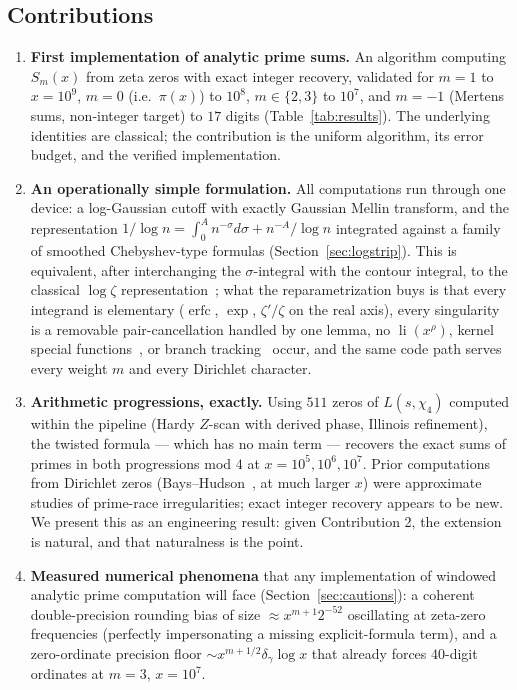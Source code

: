 \documentclass[11pt]{article}
\newcommand{\li}{\operatorname{li}}
\newcommand{\erfc}{\operatorname{erfc}}
\begin{document}
\subsection*{Contributions}
\begin{enumerate}
  \item \textbf{First implementation of analytic prime sums.} An algorithm
    computing $S_m(x)$ from zeta zeros with exact integer recovery,
    validated for $m=1$ to $x=10^9$, $m=0$ (i.e.\ $\pi(x)$) to $10^8$,
    $m\in\{2,3\}$ to $10^7$, and $m=-1$ (Mertens sums, non-integer target)
    to $17$ digits (Table~\ref{tab:results}). The underlying identities are
    classical; the contribution is the uniform algorithm, its error
    budget, and the verified implementation.
  \item \textbf{An operationally simple formulation.} All computations run
    through one device: a log-Gaussian cutoff with exactly Gaussian Mellin
    transform, and the representation
    $1/\log n=\int_0^A n^{-\sigma}d\sigma+n^{-A}/\log n$ integrated against
    a family of smoothed Chebyshev-type formulas
    (Section~\ref{sec:logstrip}). This is equivalent, after interchanging
    the $\sigma$-integral with the contour integral, to the classical
    $\log\zeta$ representation~\cite{LO87,Platt15}; what the
    reparametrization buys is that every integrand is elementary
    ($\erfc$, $\exp$, $\zeta'/\zeta$ on the real axis), every singularity
    is a removable pair-cancellation handled by one lemma, no
    $\li(x^{\rho})$, kernel special functions~\cite{FKBJ17,Buthe14}, or
    branch tracking~\cite{Platt15} occur, and the same code path serves
    every weight $m$ and every Dirichlet character.
  \item \textbf{Arithmetic progressions, exactly.} Using $511$ zeros of
    $L(s,\chi_4)$ computed within the pipeline (Hardy $Z$-scan with derived
    phase, Illinois refinement), the twisted formula --- which has no main
    term --- recovers the exact sums of primes in both progressions mod
    $4$ at $x=10^5,10^6,10^7$. Prior computations from Dirichlet zeros
    (Bays--Hudson~\cite{BH00}, at much larger $x$) were approximate
    studies of prime-race irregularities; exact integer recovery appears
    to be new. We present this as an engineering result: given
    Contribution 2, the extension is natural, and that naturalness is the
    point.
  \item \textbf{Measured numerical phenomena} that any implementation of
    windowed analytic prime computation will face
    (Section~\ref{sec:cautions}): a coherent double-precision rounding
    bias of size $\approx x^{m+1}2^{-52}$ oscillating at zeta-zero
    frequencies (perfectly impersonating a missing explicit-formula term),
    and a zero-ordinate precision floor $\sim x^{m+1/2}\delta_\gamma\log x$
    that already forces $40$-digit ordinates at $m=3$, $x=10^7$.
\end{enumerate}
\end{document}
